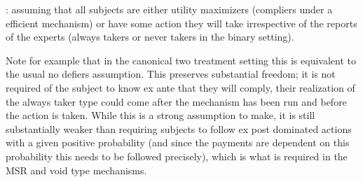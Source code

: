\begin{defn}: assuming that all subjects are either utility maximizers (compliers under a efficient mechanism) or have some action they will take irrespective of the reports of the experts (always takers or never takers in the binary setting). 
\end{defn}

Note for example that in the canonical two treatment setting this is equivalent to the usual no defiers assumption.
This preserves substantial freedom; it is not required of the subject to know ex ante that they will comply, their realization of the always taker type could come after the mechanism has been run and before the action is taken. 
While this is a strong assumption to make, it is still substantially weaker than requiring subjects to follow ex post dominated actions with a given positive probability (and since the payments are dependent on this probability this needs to be followed precisely), which is what is required in the MSR and void type mechanisms.







